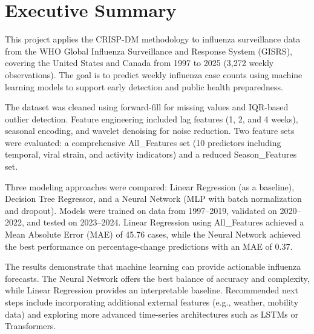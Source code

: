 \section*{Executive Summary}

This project applies the CRISP-DM methodology to influenza surveillance data from the WHO Global Influenza Surveillance and Response System (GISRS), covering the United States and Canada from 1997 to 2025 (3,272 weekly observations). The goal is to predict weekly influenza case counts using machine learning models to support early detection and public health preparedness.

The dataset was cleaned using forward-fill for missing values and IQR-based outlier detection. Feature engineering included lag features (1, 2, and 4 weeks), seasonal encoding, and wavelet denoising for noise reduction. Two feature sets were evaluated: a comprehensive All\_Features set (10 predictors including temporal, viral strain, and activity indicators) and a reduced Season\_Features set.

Three modeling approaches were compared: Linear Regression (as a baseline), Decision Tree Regressor, and a Neural Network (MLP with batch normalization and dropout). Models were trained on data from 1997--2019, validated on 2020--2022, and tested on 2023--2024. Linear Regression using All\_Features achieved a Mean Absolute Error (MAE) of 45.76 cases, while the Neural Network achieved the best performance on percentage-change predictions with an MAE of 0.37.

The results demonstrate that machine learning can provide actionable influenza forecasts. The Neural Network offers the best balance of accuracy and complexity, while Linear Regression provides an interpretable baseline. Recommended next steps include incorporating additional external features (e.g., weather, mobility data) and exploring more advanced time-series architectures such as LSTMs or Transformers.
